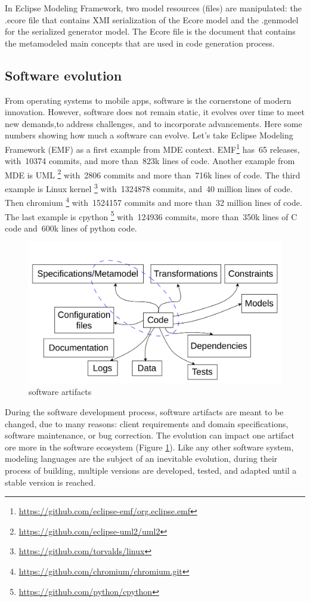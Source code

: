 In Eclipse Modeling Framework, two model resources (files) are manipulated: the .ecore file that contains  XMI serialization of the Ecore model and the .genmodel for the serialized generator model. The Ecore file is the document that contains the metamodeled main concepts that are used in code generation process.

\subsection{Software evolution}
From operating systems to mobile apps, software is the cornerstone of modern innovation. However, software does not remain static, it evolves over time to meet new demands,to address challenges, and to incorporate advancements. Here some numbers showing how much a software can evolve. Let's take Eclipse Modeling Framework (EMF) as a first example from MDE context. EMF\footnote{\url{https://github.com/eclipse-emf/org.eclipse.emf}} has~65 releases, with~10374 commits, and more than~823k lines of code. Another example from MDE is UML \footnote{\url{https://github.com/eclipse-uml2/uml2}} with~2806 commits and more than~716k lines of code. The third example is Linux kernel \footnote{\url{https://github.com/torvalds/linux}} with~1324878 commits, and~40 million lines of code. Then
chromium \footnote{\url{https://github.com/chromium/chromium.git}} with~1524157 commits and more than~32 million lines of code. The last example is
cpython \footnote{\url{https://github.com/python/cpython}} with~124936 commits, more than~350k lines of C code and~600k lines of python code.
\begin{figure}[t]
	\begin{center}
		\includegraphics[width=0.6\linewidth]{./pics/soaPics/softwareartifacts.png}
	\end{center}
	\caption{software artifacts}
	\label{fig:softwareartifacts}
\end{figure}
During the software development process, software artifacts are meant to be changed, due to many reasons: client requirements and domain specifications, software maintenance, or bug correction. The evolution can impact one artifact ore more in the software ecosystem (Figure \ref{fig:softwareartifacts}). Like any other software system, modeling languages are the subject of an inevitable evolution, during their process of building, multiple versions are developed, tested, and adapted until a stable version is reached. 

